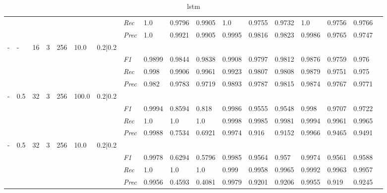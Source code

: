 \begin{table}[]
\begin{tabularx}{\textwidth}{XXXXXXX|X|XXX|XXX|XXXX}
    & & & & & & & \textit{Rec} & 1.0 & 0.9796 & 0.9905    & 1.0 & 0.9755    & 0.9732    & 1.0    & 0.9756    & 0.9766    \\
    & & & & & & & \textit{Prec} & 1.0 & 0.9921 & 0.9905 & 0.9995 & 0.9816 & 0.9823 & 0.9986 & 0.9765 & 0.9747 \\ \midrule
    - & - & 16 & 3 & 256 &10.0 & 0.2|0.2 & & & & & & & & & \\
    & & & & & & & \textit{F1} & 0.9899 & 0.9844 & 0.9838 & 0.9908 & 0.9797        & 0.9812        & 0.9876        & 0.9759        & 0.976        \\
    & & & & & & & \textit{Rec} & 0.998 & 0.9906 & 0.9961    & 0.9923 & 0.9807    & 0.9808    & 0.9879    & 0.9751    & 0.975    \\
    & & & & & & & \textit{Prec} & 0.982 & 0.9783 & 0.9719 & 0.9893 & 0.9787 & 0.9815 & 0.9874 & 0.9767 & 0.9771 \\ \midrule
    - & 0.5 & 32 & 3 & 256 &100.0 & 0.2|0.2 & & & & & & & & & \\
    & & & & & & & \textit{F1} & 0.9994 & 0.8594 & 0.818 & 0.9986 & 0.9555        & 0.9548        & 0.998        & 0.9707        & 0.9722        \\
    & & & & & & & \textit{Rec} & 1.0 & 1.0 & 1.0    & 0.9998 & 0.9985    & 0.9981    & 0.9994    & 0.9961    & 0.9965    \\
    & & & & & & & \textit{Prec} & 0.9988 & 0.7534 & 0.6921 & 0.9974 & 0.916 & 0.9152 & 0.9966 & 0.9465 & 0.9491 \\ \midrule
    - & 0.5 & 32 & 3 & 256 &10.0 & 0.2|0.2 & & & & & & & & & \\
    & & & & & & & \textit{F1} & 0.9978 & 0.6294 & 0.5796 & 0.9985 & 0.9564        & 0.957        & 0.9974        & 0.9561        & 0.9588        \\
    & & & & & & & \textit{Rec} & 1.0 & 1.0 & 1.0    & 0.999 & 0.9958    & 0.9965    & 0.9992    & 0.9963    & 0.9957    \\
    & & & & & & & \textit{Prec} & 0.9956 & 0.4593 & 0.4081 & 0.9979 & 0.9201 & 0.9206 & 0.9955 & 0.919 & 0.9245 \\ \midrule
    \end{tabularx}
    \caption{lstm}
    \label{tab:all_results_lstm}
    \end{table}